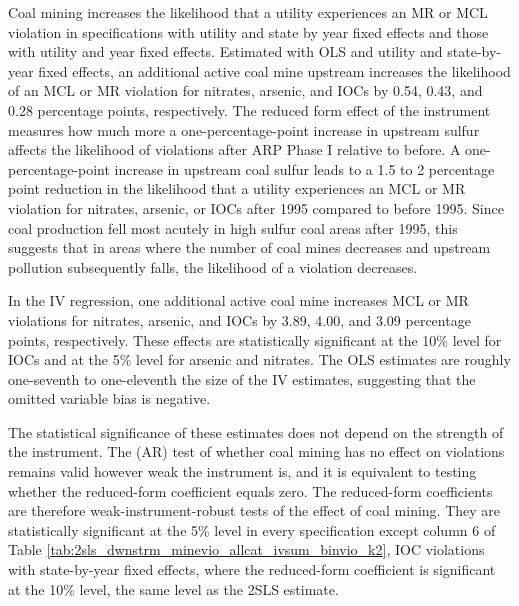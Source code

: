 \documentclass[12pt]{article}
\begin{document}
Coal mining increases the likelihood that a utility experiences an MR or MCL violation in specifications with utility and state by year fixed effects and those with utility and year fixed effects. Estimated with OLS and utility and state-by-year fixed effects, an additional active coal mine upstream increases the likelihood of an MCL or MR violation for nitrates, arsenic, and IOCs by 0.54, 0.43, and 0.28 percentage points, respectively. The reduced form effect of the instrument measures how much more a one-percentage-point increase in upstream sulfur affects the likelihood of violations after ARP Phase I relative to before. A one-percentage-point increase in upstream coal sulfur leads to a 1.5 to 2 percentage point reduction in the likelihood that a utility experiences an MCL or MR violation for nitrates, arsenic, or IOCs after 1995 compared to before 1995. Since coal production fell most acutely in high sulfur coal areas after 1995, this suggests that in areas where the number of coal mines decreases and upstream pollution subsequently falls, the likelihood of a violation decreases.

In the IV regression, one additional active coal mine increases MCL or MR violations for nitrates, arsenic, and IOCs by 3.89, 4.00, and 3.09 percentage points, respectively. These effects are statistically significant at the 10\% level for IOCs and at the 5\% level for arsenic and nitrates. The OLS estimates are roughly one-seventh to one-eleventh the size of the IV estimates, suggesting that the omitted variable bias is negative.

The statistical significance of these estimates does not depend on the strength of the instrument. The \textcite{anderson1949estimation} (AR) test of whether coal mining has no effect on violations remains valid however weak the instrument is, and it is equivalent to testing whether the reduced-form coefficient equals zero. The reduced-form coefficients are therefore weak-instrument-robust tests of the effect of coal mining. They are statistically significant at the 5\% level in every specification except column 6 of Table \ref{tab:2sls_dwnstrm_minevio_allcat_ivsum_binvio_k2}, IOC violations with state-by-year fixed effects, where the reduced-form coefficient is significant at the 10\% level, the same level as the 2SLS estimate.
\end{document}
